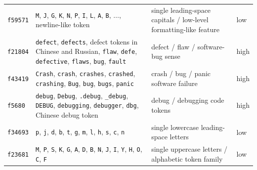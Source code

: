 \begin{table}[!tbp]
\begin{tabularx}{\textwidth}{@{}lY>{\RaggedRight\arraybackslash}p{0.24\textwidth}l@{}}
\texttt{f59571} & \texttt{M}, \texttt{J}, \texttt{G}, \texttt{K}, \texttt{N}, \texttt{P}, \texttt{I}, \texttt{L}, \texttt{A}, \texttt{B}, \(\ldots\), newline-like token & single leading-space capitals / low-level formatting-like feature & low \\
\texttt{f21804} & \texttt{defect}, \texttt{defects}, defect tokens in Chinese and Russian, \texttt{flaw}, \texttt{defe}, \texttt{defective}, \texttt{flaws}, \texttt{bug}, \texttt{fault} & defect / flaw / software-bug sense & high \\
\texttt{f43419} & \texttt{Crash}, \texttt{crash}, \texttt{crashes}, \texttt{crashed}, \texttt{crashing}, \texttt{Bug}, \texttt{bug}, \texttt{bugs}, \texttt{panic} & crash / bug / panic software failure & high \\
\texttt{f5680} & \texttt{debug}, \texttt{Debug}, \texttt{.debug}, \texttt{\_debug}, \texttt{DEBUG}, \texttt{debugging}, \texttt{debugger}, \texttt{dbg}, Chinese debug token & debug / debugging code tokens & high \\
\texttt{f34693} & \texttt{p}, \texttt{j}, \texttt{d}, \texttt{b}, \texttt{t}, \texttt{g}, \texttt{m}, \texttt{l}, \texttt{h}, \texttt{s}, \texttt{c}, \texttt{n} & single lowercase leading-space letters & low \\
\texttt{f23681} & \texttt{M}, \texttt{P}, \texttt{S}, \texttt{K}, \texttt{G}, \texttt{A}, \texttt{D}, \texttt{B}, \texttt{N}, \texttt{J}, \texttt{I}, \texttt{Y}, \texttt{H}, \texttt{O}, \texttt{C}, \texttt{F} & single uppercase letters / alphabetic token family & low \\
\bottomrule
\end{tabularx}
\end{table}
